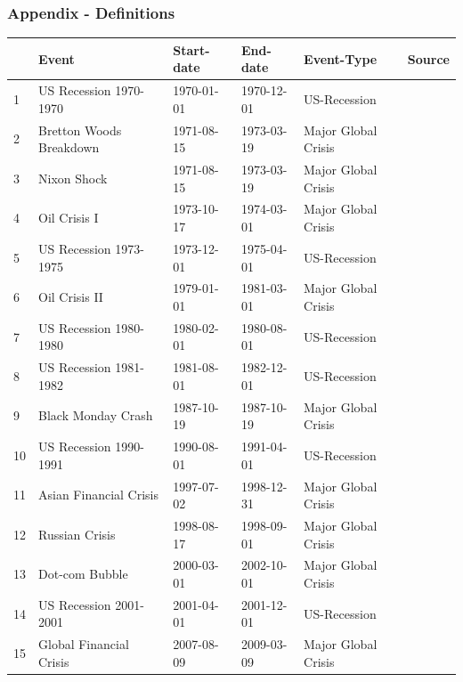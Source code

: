 \begin{frame}
	\frametitle{Appendix - Definitions}
    \begin{table}
        \footnotesize
		\begin{tabular}{l|lllll}
        \toprule
        & \textbf{Event} & \textbf{Start-date} & \textbf{End-date} & \textbf{Event-Type} & \textbf{Source} \\
        \midrule
        1 & US Recession 1970-1970 & 1970-01-01 & 1970-12-01 & US-Recession & \cite{fred_usrec} \\
        2 & Bretton Woods Breakdown & 1971-08-15 & 1973-03-19 & Major Global Crisis & \cite{corzo2025exchange} \\
        3 & Nixon Shock & 1971-08-15 & 1973-03-19 & Major Global Crisis & \cite{ehrmann2004exchange} \\
        4 & Oil Crisis I & 1973-10-17 & 1974-03-01 & Major Global Crisis & \cite{trancoso2023beyond} \\
        5 & US Recession 1973-1975 & 1973-12-01 & 1975-04-01 & US-Recession & \cite{fred_usrec} \\
        6 & Oil Crisis II & 1979-01-01 & 1981-03-01 & Major Global Crisis & \cite{trancoso2023beyond} \\
        7 & US Recession 1980-1980 & 1980-02-01 & 1980-08-01 & US-Recession & \cite{fred_usrec} \\
        8 & US Recession 1981-1982 & 1981-08-01 & 1982-12-01 & US-Recession & \cite{fred_usrec} \\
        9 & Black Monday Crash & 1987-10-19 & 1987-10-19 & Major Global Crisis & \cite{ehrmann2004exchange} \\
        10 & US Recession 1990-1991 & 1990-08-01 & 1991-04-01 & US-Recession & \cite{fred_usrec} \\
        11 & Asian Financial Crisis & 1997-07-02 & 1998-12-31 & Major Global Crisis & \cite{martins2023events} \\
        12 & Russian Crisis & 1998-08-17 & 1998-09-01 & Major Global Crisis & \cite{martins2023events} \\
        13 & Dot-com Bubble & 2000-03-01 & 2002-10-01 & Major Global Crisis & \cite{martinez2025equilibrium} \\
        14 & US Recession 2001-2001 & 2001-04-01 & 2001-12-01 & US-Recession & \cite{fred_usrec} \\
        15 & Global Financial Crisis & 2007-08-09 & 2009-03-09 & Major Global Crisis & \cite{martinez2025equilibrium} \\

\end{tabular}
\end{table}
\end{frame}
